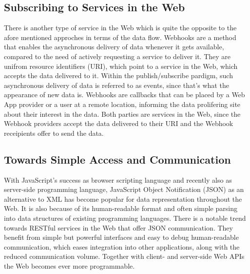 \subsection{Subscribing to Services in the Web}
There is another type of service in the Web which is quite the opposite to the afore mentioned approches in terms of the data flow.
\textrm{Webhooks} are a method that enables the asynchronous delivery of data whenever it gets available, compared to the need of actively requesting a service to deliver it.
They are unifrom resource identifiers (\textrm{URI}), which point to a service in the Web, which accepts the data delivered to it.
Within the publish/subscribe pardigm, such asynchronous delivery of data is referred to as events, since that's what the appearance of new data is.
\textrm{Webhooks} are callbacks that can be placed by a \textrm{Web App} provider or a user at a remote location, informing the data prolifering site about their interest in the data.
Both parties are services in the Web, since the \textrm{Webhook} providers accept the data delivered to their \textrm{URI} and the \textrm{Webhook} receipients offer to send the data.


\subsection{Towards Simple Access and Communication}
With JavaScript's success as browser scripting language and recently also as server-side programming language, JavaScript Object Notification (\textrm{JSON}) as an alternative to \textrm{XML} has become popular for data representation throughout the Web.
It is also because of its human-readable format and often simple parsing into data structures of existing programming languages.
There is a notable trend towards \textrm{RESTful} services in the Web that offer \textrm{JSON} communication.
They benefit from simple but powerful interfaces and easy to debug human-readable communication, which eases integration into other applications, along with the reduced communication volume.
Together with client- and server-side \textrm{Web APIs} the Web becomes ever more programmable.


